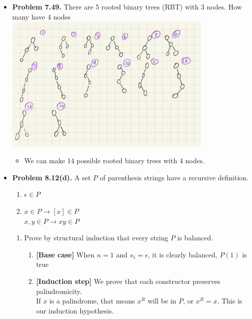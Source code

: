 \documentclass{article}
\begin{document}
\begin{itemize}
\begin{enumerate}[label=(c)]
\begin{enumerate}[label=\arabic*.]
            \end{enumerate}
        \end{enumerate}
        \item \textbf{Problem 7.49.} There are 5 rooted binary trees (RBT) with 3 nodes. How many have 4 nodes\\
        \includegraphics[width=100mm,scale=0.5]{binaryTrees.png}
        \begin{itemize}[label=$\bullet$]
            \item We can make 14 possible rooted binary trees with 4 nodes.
        \end{itemize}
        \item \textbf{Problem 8.12(d).} A set $P$ of parenthesis strings have a recursive definition.
        \begin{enumerate}[label=\arabic*.]
            \item $\epsilon \in P$
            \item $x \in P \rightarrow [x] \in P$\\
            $x,y \in P \rightarrow xy \in P$
        \end{enumerate}
        \begin{enumerate}[label=(d)]
            \item Prove by structural induction that every string $P$ is balanced.
            \begin{enumerate}[label=\roman*.]
                \item \textbf{[Base case]} When $n=1$ and $s_1 = \epsilon$, it is clearly balanced, $P(1)$ is true
                \item \textbf{[Induction step]} We prove that each constructor preserves palindromicity.\\
                If $x$ is a palindrome, that means $x^R$ will be in $P$, or $x^R =x$. This is our induction hypothesis.
                \begin{enumerate}[label=\arabic*.]

\end{enumerate}
\end{enumerate}
\end{enumerate}
\end{itemize}
\end{document}
